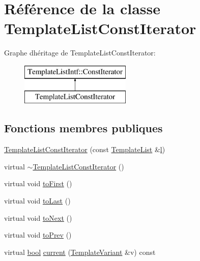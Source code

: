 \hypertarget{class_template_list_const_iterator}{}\section{Référence de la classe Template\+List\+Const\+Iterator}
\label{class_template_list_const_iterator}
Graphe d\textquotesingle{}héritage de Template\+List\+Const\+Iterator\+:\begin{figure}[H]
\begin{center}
\leavevmode
\includegraphics[height=2.000000cm]{class_template_list_const_iterator}
\end{center}
\end{figure}
\subsection*{Fonctions membres publiques}
\begin{DoxyCompactItemize}
\item 
\hyperlink{class_template_list_const_iterator_aceec15491e253e785a15e6756c38d26a}{Template\+List\+Const\+Iterator} (const \hyperlink{class_template_list}{Template\+List} \&\hyperlink{060__command__switch_8tcl_aff56f84b49947b84b2a304f51cf8e678}{l})
\item 
virtual \hyperlink{class_template_list_const_iterator_aefa6f0612ffd491689d2ca3b38b6dd59}{$\sim$\+Template\+List\+Const\+Iterator} ()
\item 
virtual void \hyperlink{class_template_list_const_iterator_aa0478c27f8d663f5fb09a89b6875cec5}{to\+First} ()
\item 
virtual void \hyperlink{class_template_list_const_iterator_abe543d04737d13d0dbdec99b4019f036}{to\+Last} ()
\item 
virtual void \hyperlink{class_template_list_const_iterator_ab7681f11844471c2522984d3e2101d24}{to\+Next} ()
\item 
virtual void \hyperlink{class_template_list_const_iterator_a80276f5474320de67b93f287cdd6cd79}{to\+Prev} ()
\item 
virtual \hyperlink{qglobal_8h_a1062901a7428fdd9c7f180f5e01ea056}{bool} \hyperlink{class_template_list_const_iterator_a727b9630c896582a100394b2cca5c85c}{current} (\hyperlink{class_template_variant}{Template\+Variant} \&v) const 
\end{DoxyCompactItemize}


